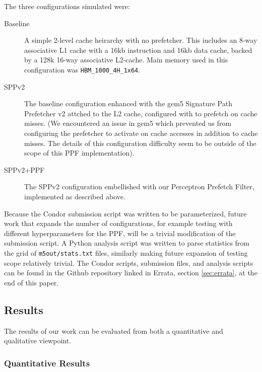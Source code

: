 \documentclass[10pt,conference]{IEEEtran}
\begin{document}
The three configurations simulated were:
\begin{description}
\item[Baseline] A simple 2-level cache heirarchy with no prefetcher. This includes an 8-way associative L1 cache with a 16kb instruction and 16kb data cache, backed by a 128k 16-way associative L2-cache. Main memory used in this configuration was \texttt{HBM\_1000\_4H\_1x64}. 
\item[SPPv2] The baseline configuration enhanced with the gem5 Signature Path Prefetcher v2 attched to the L2 cache, configured with to prefetch on cache misses. (We encountered an issue in gem5 which prevented us from configuring the prefetcher to activate on cache accesses in addition to cache misses. The details of this configuration difficulty seem to be outside of the scope of this PPF implementation).
\item[SPPv2+PPF] The SPPv2 configuration embellished with our Perceptron Prefetch Filter, implemented as described above.
\end{description}

Because the Condor submission script was written to be parameterized, future work that expands the number of configurations, for example testing with different hyperparameters for the PPF, will be a trivial modification of the submission script. A Python analysis script was written to parse statistics from the grid of \texttt{m5out/stats.txt} files, similarly making future expansion of testing scope relatively trivial. The Condor scripts, submission files, and analysis scripts can be found in the Github repository linked in Errata, section \ref{sec:errata}, at the end of this paper.

\subsection{Results}
The results of our work can be evaluated from both a quantitative and qualitative viewpoint. 

\subsubsection{Quantitative Results}
\end{document}
